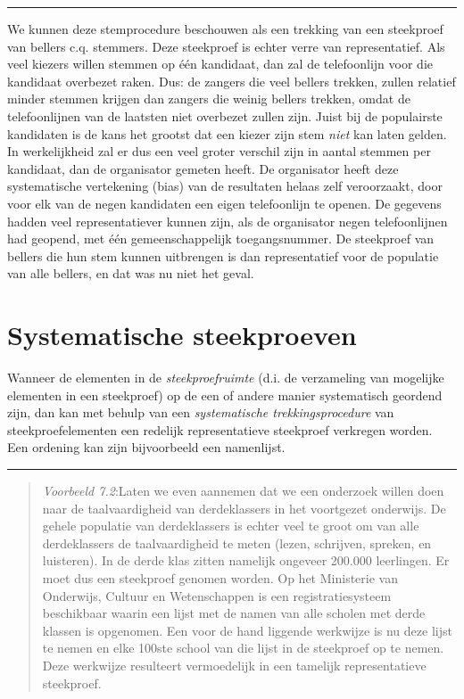\documentclass[
]{book}
\begin{document}
\begin{center}\rule{0.5\linewidth}{0.5pt}\end{center}

We kunnen deze stemprocedure beschouwen als een trekking van een
steekproef van bellers c.q. stemmers. Deze steekproef is echter verre
van representatief. Als veel kiezers willen stemmen op één kandidaat,
dan zal de telefoonlijn voor die kandidaat overbezet raken. Dus: de
zangers die veel bellers trekken, zullen relatief minder stemmen krijgen
dan zangers die weinig bellers trekken, omdat de telefoonlijnen van de
laatsten niet overbezet zullen zijn. Juist bij de populairste kandidaten
is de kans het grootst dat een kiezer zijn stem \emph{niet} kan laten gelden.
In werkelijkheid zal er dus een veel groter verschil zijn in aantal
stemmen per kandidaat, dan de organisator gemeten heeft. De organisator
heeft deze systematische vertekening (bias) van de resultaten helaas
zelf veroorzaakt, door voor elk van de negen kandidaten een eigen
telefoonlijn te openen. De gegevens hadden veel representatiever kunnen
zijn, als de organisator negen telefoonlijnen had geopend, met één
gemeenschappelijk toegangsnummer. De steekproef van bellers die hun stem
kunnen uitbrengen is dan representatief voor de populatie van alle
bellers, en dat was nu niet het geval.

\section{Systematische steekproeven}\label{sec:systematischesteekproef}

Wanneer de elementen in de \emph{steekproefruimte} (d.i. de verzameling van
mogelijke elementen in een steekproef) op de een of andere manier
systematisch geordend zijn, dan kan met behulp van een \emph{systematische
trekkingsprocedure} van steekproefelementen een redelijk representatieve
steekproef verkregen worden. Een ordening kan zijn bijvoorbeeld een
namenlijst.

\begin{center}\rule{0.5\linewidth}{0.5pt}\end{center}

\begin{quote}
\emph{Voorbeeld 7.2}:Laten we even aannemen dat we een onderzoek willen doen naar de
taalvaardigheid van derdeklassers in het voortgezet onderwijs. De gehele
populatie van derdeklassers is echter veel te groot om van alle
derdeklassers de taalvaardigheid te meten (lezen, schrijven, spreken, en
luisteren). In de derde klas zitten namelijk ongeveer 200.000
leerlingen. Er moet dus een steekproef genomen worden. Op het Ministerie
van Onderwijs, Cultuur en Wetenschappen is een registratiesysteem
beschikbaar waarin een lijst met de namen van alle scholen met derde
klassen is opgenomen. Een voor de hand liggende werkwijze is nu deze
lijst te nemen en elke 100ste school van die lijst in de steekproef op
te nemen. Deze werkwijze resulteert vermoedelijk in een tamelijk
representatieve steekproef.
\end{quote}
\end{document}

